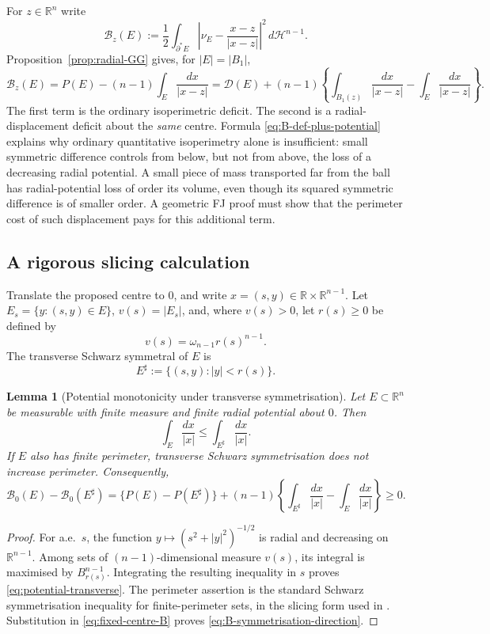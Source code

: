 \documentclass[11pt]{amsart}
\newtheorem{lemma}[theorem]{Lemma}
\theoremstyle{definition}
\newcommand{\R}{\mathbb R}
\newcommand{\Hn}{\mathcal H^{n-1}}
\newcommand{\Per}{P}
\newcommand{\Def}{\mathcal D}
\begin{document}
For \(z\in\R^n\) write
\[
   \mathcal B_z(E)
   :=\frac12\int_{\partial^*E}
        \left|\nu_E-\frac{x-z}{|x-z|}\right|^2\,d\Hn.
\tag{6.1}\label{eq:fixed-centre-B}
\]
Proposition~\ref{prop:radial-GG} gives, for \(|E|=|B_1|\),
\[
   \mathcal B_z(E)
   =\Per(E)-(n-1)\int_E\frac{dx}{|x-z|}
   =\Def(E)
     +(n-1)\left\{\int_{B_1(z)}\frac{dx}{|x-z|}
                       -\int_E\frac{dx}{|x-z|}\right\}.
\tag{6.2}\label{eq:B-def-plus-potential}
\]
The first term is the ordinary isoperimetric deficit.  The second is a
radial-displacement deficit about the \emph{same} centre.  Formula
\eqref{eq:B-def-plus-potential} explains why ordinary quantitative
isoperimetry alone is insufficient: small symmetric difference controls
from below, but not from above, the loss of a decreasing radial potential.
A small piece of mass transported far from the ball has radial-potential
loss of order its volume, even though its squared symmetric difference is
of smaller order.  A geometric FJ proof must show that the perimeter cost
of such displacement pays for this additional term.

\subsection{A rigorous slicing calculation}

Translate the proposed centre to \(0\), and write \(x=(s,y)\in
\R\times\R^{n-1}\).  Let \(E_s=\{y:(s,y)\in E\}\), \(v(s)=|E_s|\), and,
where \(v(s)>0\), let \(r(s)\ge0\) be defined by
\[
   v(s)=\omega_{n-1}r(s)^{n-1}.
\]
The transverse Schwarz symmetral of \(E\) is
\[
   E^\sharp:=\{(s,y):|y|<r(s)\}.
\tag{6.3}\label{eq:transverse-symmetral}
\]

\begin{lemma}[Potential monotonicity under transverse symmetrisation]
\label{lem:potential-transverse}
Let \(E\subset\R^n\) be measurable with finite measure and finite radial
potential about \(0\).  Then
\[
   \int_E\frac{dx}{|x|}
      \le \int_{E^\sharp}\frac{dx}{|x|}.
\tag{6.4}\label{eq:potential-transverse}
\]
If \(E\) also has finite perimeter, transverse Schwarz symmetrisation
does not increase perimeter.  Consequently,
\[
   \mathcal B_0(E)-\mathcal B_0(E^\sharp)
      =
      \bigl\{\Per(E)-\Per(E^\sharp)\bigr\}
      +(n-1)\left\{
          \int_{E^\sharp}\frac{dx}{|x|}
           -\int_E\frac{dx}{|x|}
       \right\}\ge0 .
\tag{6.5}\label{eq:B-symmetrisation-direction}
\]
\end{lemma}

\begin{proof}
For a.e.\ \(s\), the function
\(y\mapsto(s^2+|y|^2)^{-1/2}\) is radial and decreasing on
\(\R^{n-1}\).  Among sets of \((n-1)\)-dimensional measure \(v(s)\),
its integral is maximised by \(B_{r(s)}^{n-1}\).  Integrating the
resulting inequality in \(s\) proves \eqref{eq:potential-transverse}.
The perimeter assertion is the standard Schwarz symmetrisation
inequality for finite-perimeter sets, in the slicing form used in
\cite{FMP}.  Substitution in \eqref{eq:fixed-centre-B} proves
\eqref{eq:B-symmetrisation-direction}.
\end{proof}
\end{document}
